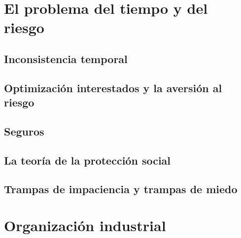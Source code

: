 \documentclass[12pt]{book}
\begin{document}
\begin{appendices}

\end{appendices}


\chapter{El problema del tiempo y del riesgo}



\section{Inconsistencia temporal}

\section{Optimización interestados y la aversión al riesgo}

\section{Seguros}



\section{La teoría de la protección social}

\section{Trampas de impaciencia y trampas de miedo}

\begin{appendices}

\end{appendices}

\chapter{Organización industrial}





\begin{appendices}
    
\end{appendices}
\end{document}
